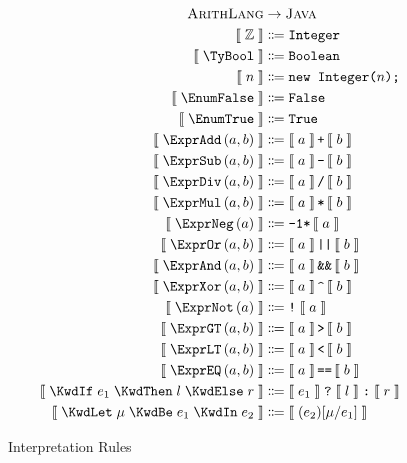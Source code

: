 \documentclass[10pt,a4paper,british,final]{article}
\begin{document}
\begin{figure}[ht]
  \centering
  \begin{align*}
    \textsc{ArithLang}&\rightarrow\textsc{Java}\\
        \interpB{\TyInt}&\Coloneqq\text{\ttfamily Integer}\\
    \interpB{\TyBool}&\Coloneqq\text{\ttfamily Boolean}\\
  \interpB{n}&\Coloneqq\text{\ttfamily new Integer(}n\text{\ttfamily);}\\
  \interpB{\EnumFalse}&\Coloneqq\text{\ttfamily False}\\
  \interpB{\EnumTrue} &\Coloneqq\text{\ttfamily True}\\
  \interpB{\exprAdd{a}{b}} &\Coloneqq\interpB{a}\,\text{\ttfamily +}\,\interpB{b}\\
  \interpB{\exprSub{a}{b}} &\Coloneqq\interpB{a}\,\text{\ttfamily -}\,\interpB{b}\\
  \interpB{\exprDiv{a}{b}} &\Coloneqq\interpB{a}\,\text{\ttfamily /}\,\interpB{b}\\
  \interpB{\exprMul{a}{b}} &\Coloneqq\interpB{a}\,\text{\ttfamily *}\,\interpB{b}\\
  \interpB{\exprNeg{a}}    &\Coloneqq\text{\ttfamily-1*}\,\interpB{a}\\
  \interpB{\exprOr{a}{b}}  &\Coloneqq\interpB{a}\,\text{\ttfamily ||}\,\interpB{b}\\
  \interpB{\exprAnd{a}{b}} &\Coloneqq\interpB{a}\,\text{\ttfamily \&\&}\,\interpB{b}\\
  \interpB{\exprXor{a}{b}} &\Coloneqq\interpB{a}\,\text{\ttfamily \textasciicircum}\,\interpB{b}\\
  \interpB{\exprNot{a}}    &\Coloneqq\text{\ttfamily !}\;\interpB{a}\\
  \interpB{\exprGT{a}{b}}  &\Coloneqq\interpB{a}\,\text{\ttfamily \textgreater}\,\interpB{b}\\
  \interpB{\exprLT{a}{b}}  &\Coloneqq\interpB{a}\,\text{\ttfamily \textless}\,\interpB{b}\\
  \interpB{\exprEQ{a}{b}}  &\Coloneqq\interpB{a}\,\text{\ttfamily ==}\,\interpB{b}\\
  \interpB{\stmtIf{e_1}{l}{r}} &\Coloneqq\interpB{e_1}\;\text{\ttfamily ?}\;\interpB{l}\;\text{\ttfamily :}\;\interpB{r}\\
  \interpB{\stmtLet{\mu}{e_1}{e_2}}&\Coloneqq\interpB{\subst{e_{2}}{\mu}{e_{1}}}
\end{align*}
  \caption{\label{fig:interp}Interpretation Rules}
\end{figure}
\end{document}
